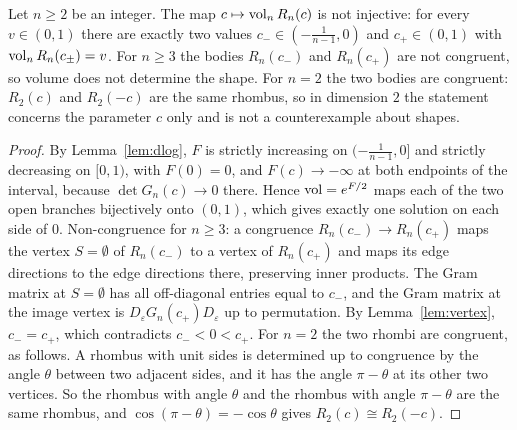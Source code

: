 \begin{theorem}\label{thm:main}
Let $n\ge2$ be an integer. The map $c\mapsto\operatorname{vol}_nR_n(c)$ is not injective: for every $v\in(0,1)$ there are exactly two values $c_-\in(-\frac{1}{n-1},0)$ and $c_+\in(0,1)$ with $\operatorname{vol}_nR_n(c_\pm)=v$.
For $n\ge3$ the bodies $R_n(c_-)$ and $R_n(c_+)$ are not congruent, so volume does not determine the shape. For $n=2$ the two bodies are congruent: $R_2(c)$ and $R_2(-c)$ are the same rhombus, so in dimension $2$ the statement concerns the parameter $c$ only and is not a counterexample about shapes.
\end{theorem}
\begin{proof}
By Lemma~\ref{lem:dlog}, $F$ is strictly increasing on $(-\frac{1}{n-1},0]$ and strictly decreasing on $[0,1)$, with $F(0)=0$, and $F(c)\to-\infty$ at both endpoints of the interval, because $\det G_n(c)\to0$ there.
Hence $\operatorname{vol}=e^{F/2}$ maps each of the two open branches bijectively onto $(0,1)$, which gives exactly one solution on each side of $0$.
Non-congruence for $n\ge3$: a congruence $R_n(c_-)\to R_n(c_+)$ maps the vertex $S=\emptyset$ of $R_n(c_-)$ to a vertex of $R_n(c_+)$ and maps its edge directions to the edge directions there, preserving inner products. The Gram matrix at $S=\emptyset$ has all off-diagonal entries equal to $c_-$, and the Gram matrix at the image vertex is $D_\varepsilon G_n(c_+)D_\varepsilon$ up to permutation. By Lemma~\ref{lem:vertex}, $c_-=c_+$, which contradicts $c_-<0<c_+$. For $n=2$ the two rhombi are congruent, as follows. A rhombus with unit sides is determined up to congruence by the angle $\theta$ between two adjacent sides, and it has the angle $\pi-\theta$ at its other two vertices. So the rhombus with angle $\theta$ and the rhombus with angle $\pi-\theta$ are the same rhombus, and $\cos(\pi-\theta)=-\cos\theta$ gives $R_2(c)\cong R_2(-c)$.
\end{proof}
